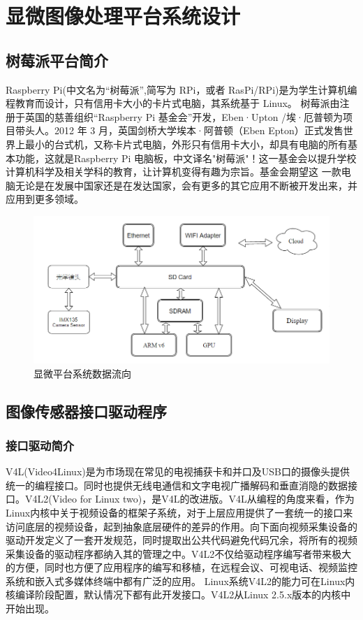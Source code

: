 \chapter{显微图像处理平台系统设计}
%


 


\section{树莓派平台简介}
Raspberry Pi(中文名为“树莓派”,简写为 RPi，或者 RasPi/RPi)是为学生计算机编程教育而设计，只有信用卡大小的卡片式电脑，其系统基于 Linux。
树莓派由注册于英国的慈善组织“Raspberry Pi 基金会”开发，Eben·Upton /埃·厄普顿为项目带头人。2012 年 3 月，英国剑桥大学埃本·阿普顿（Eben Epton）正式发售世界上最小的台式机，又称卡片式电脑，外形只有信用卡大小，却具有电脑的所有基本功能，这就是Raspberry Pi 电脑板，中文译名"树莓派"！这一基金会以提升学校计算机科学及相关学科的教育，让计算机变得有趣为宗旨。基金会期望这 一款电脑无论是在发展中国家还是在发达国家，会有更多的其它应用不断被开发出来，并应用到更多领域。\cite{raspHDMI}\cite{rasphome}
\begin{figure}[h]
\centering
\includegraphics[width=0.7\linewidth]{Figure/rasp_2}
\caption{显微平台系统数据流向}
\label{fig:rasp_2}
\end{figure}


\section{图像传感器接口驱动程序}
\subsection{接口驱动简介}
V4L(Video4Linux)是为市场现在常见的电视捕获卡和并口及USB口的摄像头提供统一的编程接口。同时也提供无线电通信和文字电视广播解码和垂直消隐的数据接口。V4L2(Video for Linux two)，是V4L的改进版。V4L从编程的角度来看，作为Linux内核中关于视频设备的框架子系统，对于上层应用提供了一套统一的接口来访问底层的视频设备，起到抽象底层硬件的差异的作用。向下面向视频采集设备的驱动开发定义了一套开发规范，同时提取出公共代码避免代码冗余，将所有的视频采集设备的驱动程序都纳入其的管理之中。V4L2不仅给驱动程序编写者带来极大的方便，同时也方便了应用程序的编写和移植，在远程会议、可视电话、视频监控系统和嵌入式多媒体终端中都有广泛的应用。\cite{v4l2embedded}
Linux系统V4L2的能力可在Linux内核编译阶段配置，默认情况下都有此开发接口。V4L2从Linux 2.5.x版本的内核中开始出现。

